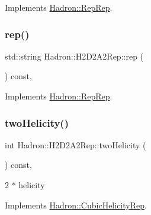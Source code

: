 Implements \mbox{\hyperlink{structHadron_1_1RepRep_ab3213025f6de249f7095892109575fde}{Hadron\+::\+Rep\+Rep}}.

\mbox{\label{structHadron_1_1H2D2A2Rep_a41083c39082d6fee296da79892e8b053}} 
\subsubsection{\texorpdfstring{rep()}{rep()}\hspace{0.1cm}{\footnotesize\ttfamily [5/5]}}
{\footnotesize\ttfamily std\+::string Hadron\+::\+H2\+D2\+A2\+Rep\+::rep (\begin{DoxyParamCaption}{ }\end{DoxyParamCaption}) const\hspace{0.3cm}{\ttfamily [inline]}, {\ttfamily [virtual]}}



Implements \mbox{\hyperlink{structHadron_1_1RepRep_ab3213025f6de249f7095892109575fde}{Hadron\+::\+Rep\+Rep}}.

\mbox{\label{structHadron_1_1H2D2A2Rep_a37671b4331422027fe047d7e50288c54}} 
\subsubsection{\texorpdfstring{twoHelicity()}{twoHelicity()}\hspace{0.1cm}{\footnotesize\ttfamily [1/3]}}
{\footnotesize\ttfamily int Hadron\+::\+H2\+D2\+A2\+Rep\+::two\+Helicity (\begin{DoxyParamCaption}{ }\end{DoxyParamCaption}) const\hspace{0.3cm}{\ttfamily [inline]}, {\ttfamily [virtual]}}

2 $\ast$ helicity 

Implements \mbox{\hyperlink{structHadron_1_1CubicHelicityRep_af507aa56fc2747eacc8cb6c96db31ecc}{Hadron\+::\+Cubic\+Helicity\+Rep}}.

\mbox{\label{structHadron_1_1H2D2A2Rep_a37671b4331422027fe047d7e50288c54}} 
